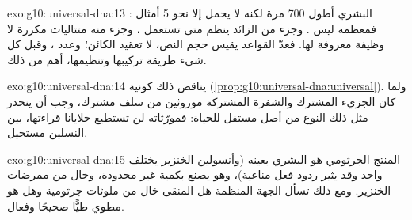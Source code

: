 \begin{solution}{exo:g10:universal-dna:13}
 البشري أطول 700 مرة لكنه لا يحمل إلا نحو 5 أمثال : فمعظمه
ليس . وجزء من  الزائد ينظم متى تستعمل ، وجزء منه
متتاليات مكررة لا وظيفة معروفة لها. فعدّ القواعد يقيس حجم النص، لا
تعقيد الكائن؛ وعدد ، وقبل كل شيء طريقة تركيبها وتنظيمها،
أهم من ذلك.
\end{solution}

\begin{solution}{exo:g10:universal-dna:14}
يناقض ذلك كونية  (\cref{prop:g10:universal-dna:universal}). ولما
كان الجزيء المشترك والشفرة المشتركة موروثين من سلف مشترك، وجب أن
ينحدر مثل ذلك النوع من أصل مستقل للحياة: فمورّثاته لن تستطيع خلايانا
قراءتها،  بين النسلين مستحيل.
\end{solution}

\begin{solution}{exo:g10:universal-dna:15}
المنتج الجرثومي هو  البشري بعينه (وأنسولين الخنزير يختلف  واحد وقد يثير ردود فعل مناعية)، وهو يصنع بكمية غير محدودة، وخال
من ممرضات الخنزير. ومع ذلك تسأل الجهة المنظمة هل  المنقى خال
من ملوثات جرثومية وهل هو مطوي طيًّا صحيحًا وفعال.
\end{solution}

